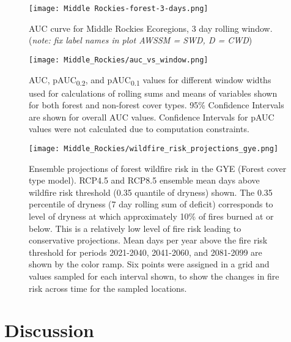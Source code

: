 \documentclass[11pt]{article}
\newcommand{\pauc}[1]{pAUC\textsubscript{#1}}
\begin{document}
\begin{figure}
  \centering
  \texttt{[image: Middle Rockies-forest-3-days.png]}
  \caption{AUC curve for Middle Rockies Ecoregions, 3 day rolling window. (\textit{note: fix label names in plot AWSSM = SWD, D = CWD})}
  \label{fig:auc}
\end{figure}

\begin{figure}[ht]
  \centering
  \texttt{[image: Middle\_Rockies/auc\_vs\_window.png]}
  \caption{AUC, \pauc{0.2}, and \pauc{0.1} values for different window widths used for calculations of rolling sums and means of variables shown for both forest and non-forest cover types. 95\% Confidence Intervals are shown for overall AUC values.  Confidence Intervals for pAUC values were not calculated due to computation constraints.}
  \label{fig:auc_window}
\end{figure}

\begin{figure}
  \centering
  \texttt{[image: Middle\_Rockies/wildfire\_risk\_projections\_gye.png]}
  \caption{Ensemble projections of forest wildfire risk in the GYE (Forest cover type model).  RCP4.5 and RCP8.5 ensemble mean days above wildfire risk threshold (0.35 quantile of dryness) shown.  The 0.35 percentile of dryness (7 day rolling sum of deficit) corresponds to level of dryness at which approximately 10\% of fires burned at or below.  This is a relatively low level of fire risk leading to conservative projections.  Mean days per year above the fire risk threshold for periods 2021-2040, 2041-2060, and 2081-2099 are shown by the color ramp.  Six points were assigned in a grid and values sampled for each interval shown, to show the changes in fire risk across time for the sampled locations.}
  \label{fig:projected-risk}
\end{figure}

\section{Discussion}
\end{document}
